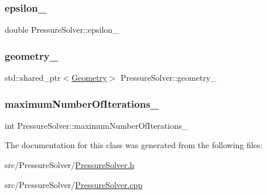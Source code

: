 \subsubsection{\texorpdfstring{epsilon\_}{epsilon\_}}
{\footnotesize\ttfamily double Pressure\+Solver\+::epsilon\+\_\+\hspace{0.3cm}{\ttfamily [protected]}}

\mbox{\label{classPressureSolver_af3df3def08159cc002f5f963f7e8be27}} 
\subsubsection{\texorpdfstring{geometry\_}{geometry\_}}
{\footnotesize\ttfamily std\+::shared\+\_\+ptr$<$\mbox{\hyperlink{classGeometry}{Geometry}}$>$ Pressure\+Solver\+::geometry\+\_\+\hspace{0.3cm}{\ttfamily [protected]}}

\mbox{\label{classPressureSolver_af3b02d29bf1b21ad8b7e6edf8c2f4e87}} 
\subsubsection{\texorpdfstring{maximumNumberOfIterations\_}{maximumNumberOfIterations\_}}
{\footnotesize\ttfamily int Pressure\+Solver\+::maximum\+Number\+Of\+Iterations\+\_\+\hspace{0.3cm}{\ttfamily [protected]}}



The documentation for this class was generated from the following files\+:\begin{DoxyCompactItemize}
\item 
src/\+Pressure\+Solver/\mbox{\hyperlink{PressureSolver_8h}{Pressure\+Solver.\+h}}\item 
src/\+Pressure\+Solver/\mbox{\hyperlink{PressureSolver_8cpp}{Pressure\+Solver.\+cpp}}\end{DoxyCompactItemize}
